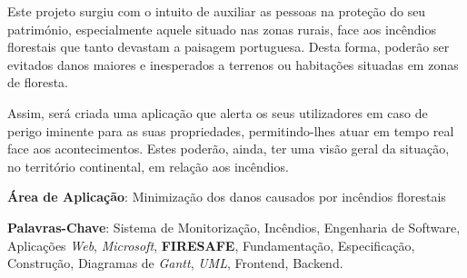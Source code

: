 \documentclass[a4paper,12pt]{scrreprt}
\newcommand{\tab}{
    \hspace{1cm}}
\begin{document}

\makecover

\renewenvironment{abstract}
 {\par\noindent\textbf{\Large\abstractname}\par\bigskip}
 {}

\begin{flushleft}
\begin{abstract}
    \tab Este projeto surgiu com o intuito de auxiliar as pessoas na proteção do seu património, especialmente aquele situado nas zonas rurais, face aos incêndios florestais que tanto devastam a paisagem portuguesa. Desta forma, poderão ser evitados danos maiores e inesperados a terrenos ou habitações situadas em zonas de floresta.
    
    \tab Assim, será criada uma aplicação que alerta os seus utilizadores em caso de perigo iminente para as suas propriedades, permitindo-lhes atuar em tempo real face aos acontecimentos. Estes poderão, ainda, ter uma visão geral da situação, no território continental, em relação aos incêndios.

    \par \textbf{Área de Aplicação}: Minimização dos danos causados por incêndios florestais
    \par \textbf{Palavras-Chave}: Sistema de Monitorização, Incêndios, Engenharia de Software, Aplicações \textit{Web}, \textit{Microsoft}, \textbf{FIRESAFE}, Fundamentação, Especificação, Construção, Diagramas de \textit{Gantt}, \textit{UML}, Frontend, Backend.
\end{abstract}
\end{flushleft}
\end{document}
